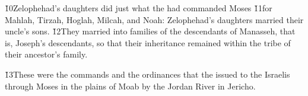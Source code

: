 \v{10}Zelophehad's daughters did just what the  had commanded Moses \v{11}for Mahlah, Tirzah, Hoglah, Milcah, and Noah: Zelophehad's daughters married their uncle's sons. \v{12}They married into families of the descendants of Manasseh, that is, Joseph's descendants, so that their inheritance remained within the tribe of their ancestor's family.

\v{13}These were the commands and the ordinances that the  issued to the Israelis through Moses in the plains of Moab by the Jordan River in Jericho.
